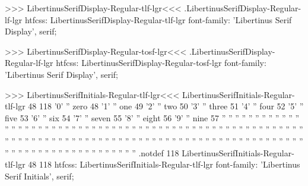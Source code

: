 >>>
\<LibertinusSerifDisplay-Regular-tlf-lgr\><<<
.LibertinusSerifDisplay-Regular-lf-lgr
htfcss:  LibertinusSerifDisplay-Regular-tlf-lgr  font-family: 'Libertinus Serif Display', serif;

>>>
\<LibertinusSerifDisplay-Regular-tosf-lgr\><<<
.LibertinusSerifDisplay-Regular-lf-lgr
htfcss:  LibertinusSerifDisplay-Regular-tosf-lgr  font-family: 'Libertinus Serif Display', serif;

>>>
\<LibertinusSerifInitials-Regular-tlf-lgr\><<<
LibertinusSerifInitials-Regular-tlf-lgr 48 118
'0' '' zero 48   %
'1' '' one 49    %
'2' '' two 50    %
'3' '' three 51  %
'4' '' four 52   %
'5' '' five 53   %
'6' '' six 54    %
'7' '' seven 55  %
'8' '' eight 56  %
'9' '' nine 57   %
'' ''            %
'' ''            %
'' ''            %
'' ''            %
'' ''            %
'' ''            %
'' ''            %
'' ''            %
'' ''  
'' ''  
'' ''  
'' ''  
'' ''  
'' ''  
'' ''  
'' ''  
'' ''  
'' ''  
'' ''  
'' ''  
'' ''  
'' ''  
'' ''  
'' ''  
'' ''  
'' ''  
'' ''  
'' ''  
'' ''  
'' ''  
'' ''  
'' ''  
'' ''  
'' ''  
'' ''  
'' ''  
'' ''  
'' ''  
'' ''  
'' ''  
'' ''  
'' ''  
'' ''  
'' ''  
'' ''  
'' ''  
'' ''  
'' ''  
'' ''  
'' ''  
'' ''  
'' ''  
'' ''  
'' ''  
'' ''  
'' ''  
'' ''  
'' ''  
'' ''  
'' ''  
'' '' .notdef 118
LibertinusSerifInitials-Regular-tlf-lgr 48 118
htfcss:  LibertinusSerifInitials-Regular-tlf-lgr  font-family: 'Libertinus Serif Initials', serif;

